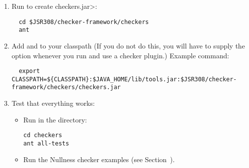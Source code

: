 \begin{enumerate}

\item
Run  to create \<checkers.jar>:

\begin{Verbatim}
  cd $JSR308/checker-framework/checkers
  ant
\end{Verbatim}

\item Add  and  to your classpath
  (If you do not do this, you will have to supply the  option
  whenever you run  and use a checker plugin.)
  Example command:

\begin{smaller}
\begin{Verbatim}
  export CLASSPATH=${CLASSPATH}:$JAVA_HOME/lib/tools.jar:$JSR308/checker-framework/checkers/checkers.jar
\end{Verbatim}
\end{smaller}

\item Test that everything works:

  \begin{itemize}

  \item Run  in the  directory:
\begin{Verbatim}
cd checkers
ant all-tests
\end{Verbatim}

  \item Run the Nullness checker examples (see
    Section~).

  \end{itemize}

\end{enumerate}


